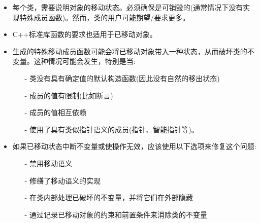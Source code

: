 \begin{itemize}
	\item 每个类，需要说明对象的移动状态。必须确保是可销毁的(通常情况下没有实现特殊成员函数)。然而，类的用户可能期望/要求更多。
	\item C++标准库函数的要求也适用于已移动对象。
	\item 生成的特殊移动成员函数可能会将已移动对象带入一种状态，从而破坏类的不变量。这种情况可能会发生，特别是当:
	\begin{itemize}
		\item[-] 类没有具有确定值的默认构造函数(因此没有自然的移出状态)
		\item[-] 成员的值有限制(比如断言)
		\item[-] 成员的值相互依赖
		\item[-] 使用了具有类似指针语义的成员(指针、智能指针等)。
	\end{itemize}
	\item 如果已移动状态中断不变量或使操作无效，应该使用以下选项来修复这个问题:
	\begin{itemize}
		\item[-] 禁用移动语义
		\item[-] 修缮了移动语义的实现
		\item[-] 在类内部处理已破坏的不变量，并将它们在外部隐藏
		\item[-] 通过记录已移动对象的约束和前置条件来消除类的不变量
	\end{itemize}
\end{itemize}


\newpage